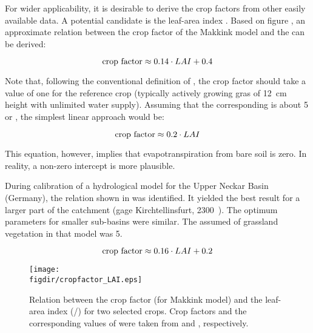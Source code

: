For wider applicability, it is desirable to derive the crop factors from other easily available data. A potential candidate is the leaf-area index \leafAreaIndex. Based on figure , an approximate relation between the crop factor of the Makkink model and the \leafAreaIndex{} can be derived:

\begin{equation} \label{eqn:eta:cropfactor-LAI}
  \text{crop factor} \approx 0.14 \cdot LAI + 0.4 
\end{equation}

Note that, following the conventional definition of \etPot{}, the crop factor should take a value of one for the reference crop (typically actively growing gras of 12~cm height with unlimited water supply). Assuming that the corresponding \leafAreaIndex{} is about 5 \citep[see, \eg][]{Misra1981} or \citep[][page 11]{Bremicker2006}, the simplest linear approach would be:

\begin{equation} \label{eqn:eta:cropfactor-LAI-simple}
  \text{crop factor} \approx 0.2 \cdot LAI
\end{equation}

This equation, however, implies that evapotranspiration from bare soil is zero. In reality, a non-zero intercept is more plausible.

During calibration of a hydrological model for the Upper Neckar Basin (Germany), the relation shown in  was identified. It yielded the best result for a larger part of the catchment (gage Kirchtellinsfurt, 2300~\sqkm). The optimum parameters for smaller sub-basins were similar. The assumed \leafAreaIndex{} of grassland vegetation in that model was 5.

\begin{equation} \label{eqn:eta:cropfactor-LAI-Neckar}
  \text{crop factor} \approx 0.16 \cdot LAI + 0.2 
\end{equation}



\begin{figure}
  \centering
  \texttt{[image: \\figdir/cropfactor\_LAI.eps]}
  \caption[Relation between the crop factor (for Makkink model) and the leaf-area index (\sqm/\sqm) for two selected crops.]{Relation between the crop factor (for Makkink model) and the leaf-area index (\sqm/\sqm) for two selected crops. Crop factors and the corresponding values of \leafAreaIndex{} were taken from \citet{Feddes1987} and \citet{Ludwig2006}, respectively. \label{fig:et:real:cropfactor-LAI}}
\end{figure}

